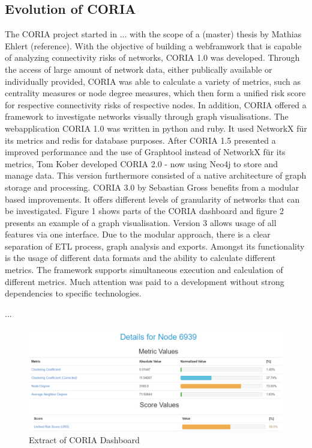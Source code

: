 \documentclass[conference]{IEEEtran}
\begin{document}
\subsection{Evolution of CORIA}
The CORIA project started in ... with the scope of a (master) thesis by Mathias Ehlert (reference). With the objective of building a webframwork that is capable of analyzing connectivity risks of networks, CORIA 1.0 was developed. Through the access of large amount of network data, either publically available or individually provided, CORIA was able to calculate a variety of metrics, such as  
centrality measures or node degree measures, which then form a unified risk score for respective connectivity risks of respective nodes. In addition, CORIA offered a framework to investigate networks visually through graph visualisations. 
 The webapplication CORIA 1.0 was written in python and ruby. It used NetworkX für its metrics and redis for database purposes. After CORIA 1.5 presented a improved performance and the use of Graphtool instead of NetworkX für its metrics, Tom Kober developed CORIA 2.0 - now using Neo4j to store and manage data. This version furthermore consisted of a native architecture of graph storage and processing. CORIA 3.0 by Sebastian Gross benefits from a modular based improvements. It offers different levels of granularity of networks that can be investigated. Figure 1 shows parts of the CORIA dashboard and figure 2 presents an example of a graph visualisation. Version 3 allows usage of all features via one interface. Due to the modular approach, there is a clear separation of ETL process, graph analysis and exports. Amongst its functionality is the usage of different data formats and the ability to calculate different metrics. The framework supports simultaneous execution and calculation of different metrics. Much attention was paid to a development without strong dependencies to specific technologies.
   
... \\ 

 





\begin{figure}[htbp]
\centerline{\includegraphics[scale=0.4]{Graphics/CORIAExtract.PNG}}
\caption{Extract of CORIA Dashboard}
\label{fig}
\end{figure}
\end{document}
